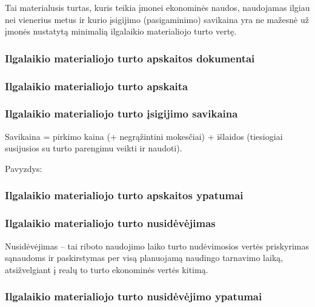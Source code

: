 
Tai materialusis turtas, kuris teikia įmonei ekonominės naudos,
naudojamas ilgiau nei vienerius metus ir kurio įsigijimo
(pasigaminimo) savikaina yra ne mažesnė už įmonės nustatytą
minimalią ilgalaikio materialiojo turto vertę.

\subsubsection{Ilgalaikio materialiojo turto apskaitos dokumentai}


\subsubsection{Ilgalaikio materialiojo turto apskaita}



\subsubsection{Ilgalaikio materialiojo turto įsigijimo savikaina}


Savikaina = pirkimo kaina (+ negrąžintini mokesčiai) + išlaidos
(tiesiogiai susijusios su turto parengimu veikti ir naudoti).

Pavyzdys:  

\subsubsection{Ilgalaikio materialiojo turto apskaitos ypatumai}




\subsubsection{Ilgalaikio materialiojo turto nusidėvėjimas}


Nusidėvėjimas – tai riboto naudojimo laiko turto nudėvimosios vertės
priskyrimas sąnaudoms ir paskirstymas per visą planuojamą naudingo
tarnavimo laiką, atsižvelgiant į realų to turto ekonominės
vertės kitimą.

\subsubsection{Ilgalaikio materialiojo turto nusidėvėjimo ypatumai}

